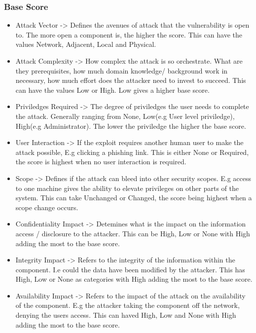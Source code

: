 \documentclass[12pt]{article}
\begin{document}
\subsubsection*{Base Score}

\begin{itemize}

	\item Attack Vector -> Defines the avenues of attack that the vulnerability is open to. The more open a component is, the higher the score. This
	      can have the values Network, Adjacent, Local and Physical.

	\item Attack Complexity -> How complex the attack is so orchestrate. What are they prerequisites, how much domain knowledge/ background work in
	      necessary, how much effort does the attacker need to invest to succeed. This can have the values Low or High. Low gives a higher base score.

	\item Priviledges Required -> The degree of priviledges the user needs to complete the attack. Generally ranging from None, Low(e.g User level
	      priviledge), High(e.g Administrator). The lower the priviledge the higher the base score.

	\item User Interaction -> If the exploit requires another human user to make the attack possible, E.g clicking a phishing link. This is either
	      None or Required, the score is highest when no user interaction is required.

	\item Scope -> Defines if the attack can bleed into other security scopes. E.g access to one machine gives the ability to elevate privileges on
	      other parts of the system. This can take Unchanged or Changed, the score being highest when a scope change occurs.

	\item Confidentiality Impact -> Detemines what is the impact on the information access / disclosure to the attacker. This can be High, Low or None
	      with High adding the most to the base score.

	\item Integrity Impact -> Refers to the integrity of the information within the component. I.e could the data have been modified by the attacker.
	      This has High, Low or None as categories with High adding the most to the base score.

	\item Availability Impact -> Refers to the impact of the attack on the availability of the component. E.g the attacker taking the component off
	      the network, denying the users access. This can haved High, Low and None with High adding the most to the base score.

\end{itemize}
\end{document}
